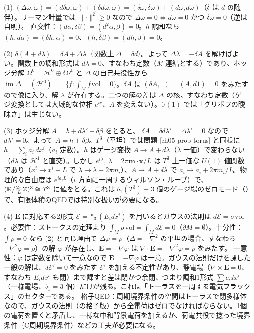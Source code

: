 \begin{solution}
(1) $(\Delta\omega,\omega)=(d\delta\omega,\omega)+(\delta d\omega,\omega)=(\delta\omega,\delta\omega)+(d\omega,d\omega)$（$\delta$ は $d$ の随伴）。リーマン計量では $\lVert\cdot\rVert^2\ge0$ なので $\Delta\omega=0\iff d\omega=0$ かつ $\delta\omega=0$（逆は自明）。
直交性：$(d\alpha,\delta\beta)=(d^2\alpha,\beta)=0$。$h$ 調和なら $(h,d\alpha)=(\delta h,\alpha)=0$、$(h,\delta\beta)=(dh,\beta)=0$。

(2) $\delta(A+d\lambda)=\delta A+\Delta\lambda$（関数上 $\Delta=\delta d$）。よって $\Delta\lambda=-\delta A$ を解けばよい。関数上の調和形式は $d\lambda=0$、すなわち定数（$M$ 連結とする）であり、ホッジ分解 $\Omega^0=\mathcal H^0\oplus\delta\Omega^1$ と $\Delta$ の自己共役性から $\operatorname{im}\Delta=(\mathcal H^0)^\perp=\{f:\int_Mf\,\mathrm{vol}=0\}$。$\delta A$ は $(\delta A,1)=(A,d1)=0$ をみたすので像に入り、解 $\lambda$ が存在する。二つの解の差は $\Delta$ の核、すなわち定数（ゲージ変換としては大域的な位相 $e^{ic}$、$A$ を変えない）。$U(1)$ では「グリボフの曖昧さ」は生じない。

(3) ホッジ分解 $A=h+d\lambda'+\delta\beta$ をとると、 $\delta A=\delta d\lambda'=\Delta\lambda'=0$ なので $d\lambda'=0$。よって $A=h+\delta\beta$。$T^3$（平坦）では問題 \ref{ch05-prob-torus} と同様に $h=\sum_ia_i\,dx^i$（$a_i$ 定数）。$h$ はゲージ変換 $A\to A+d\lambda$（$\lambda$ 一価）で変わらない（$d\lambda$ は $\mathcal H^1$ と直交）。しかし $e^{i\lambda}$, $\lambda=2\pi\bm m\cdot\bm x/L$ は $T^3$ 上一価な $U(1)$ 値関数であり（$x^i\to x^i+L$ で $\lambda\to\lambda+2\pi m_i$）、$A\to A+d\lambda$ で $a_i\to a_i+2\pi m_i/L$。物理的な自由度は $e^{ia_iL}$（$i$ 方向に一周するウィルソン・ループ）で、$(\mathbb{R}/\tfrac{2\pi}{L}\mathbb{Z})^3\cong T^3$ に値をとる。これは $b_1(T^3)=3$ 個のゲージ場のゼロモード（）で、有限体積のQEDでは特別な扱いが必要になる。

(4) $\bm E$ に対応する2形式 $\mathcal E={*_3}(E_idx^i)$ を用いるとガウスの法則は $d\mathcal E=\rho\,\mathrm{vol}$。必要性：ストークスの定理より $\int_M\rho\,\mathrm{vol}=\int_Md\mathcal E=0$（$\partial M=\emptyset$）。十分性：$\int\rho=0$ なら (2) と同じ理由で $\Delta\varphi=\rho$（$\Delta=-\nabla^2$ の平坦の場合、すなわち $-\nabla^2\varphi=\rho$）の解 $\varphi$ が存在し、$\bm E=-\nabla\varphi$ は $\nabla\cdot\bm E=-\nabla^2\varphi=\rho$ をみたす。
一意性：$\varphi$ は定数を除いて一意なので $\bm E=-\nabla\varphi$ は一意。ガウスの法則だけを課した一般の解は、$d\mathcal E'=0$ をみたす $\mathcal E'$ を加える不定性があり、静電場（$\nabla\times\bm E=0$、すなわち $E_idx^i$ も閉）まで課すと差は閉かつ余閉、つまり調和1形式 $\sum c_idx^i$（一様電場、$b_1=3$ 個）だけが残る。これは「トーラスを一周する電気フラックス」のセクターである。
格子QED：周期境界条件の空間はトーラスで閉多様体なので、ガウスの法則（の格子版）から全電荷はゼロでなければならない。1個の電荷を置くと矛盾し、一様な中和背景電荷を加えるか、荷電共役で捻った境界条件（C周期境界条件）などの工夫が必要になる。
\end{solution}

